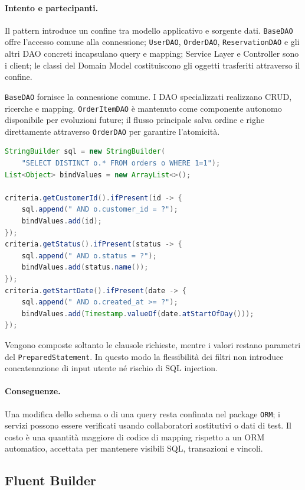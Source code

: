 \documentclass[12pt,a4paper]{article}
\newcommand{\code}[1]{\nolinkurl{#1}}
\begin{document}
\paragraph{Intento e partecipanti.}
Il pattern introduce un confine tra modello applicativo e sorgente dati.
\code{BaseDAO} offre l'accesso comune alla connessione; \code{UserDAO},
\code{OrderDAO}, \code{ReservationDAO} e gli altri DAO concreti incapsulano
query e mapping; Service Layer e Controller sono i client; le classi del Domain
Model costituiscono gli oggetti trasferiti attraverso il confine.

\code{BaseDAO} fornisce la connessione comune. I DAO specializzati realizzano
CRUD, ricerche e mapping. \code{OrderItemDAO} è mantenuto come componente
autonomo disponibile per evoluzioni future; il flusso principale salva ordine e
righe direttamente attraverso \code{OrderDAO} per garantire l'atomicità.

\begin{lstlisting}[style=codeStyle,language=Java,
caption={Costruzione sicura di una ricerca SQL dinamica.}]
StringBuilder sql = new StringBuilder(
    "SELECT DISTINCT o.* FROM orders o WHERE 1=1");
List<Object> bindValues = new ArrayList<>();

criteria.getCustomerId().ifPresent(id -> {
    sql.append(" AND o.customer_id = ?");
    bindValues.add(id);
});
criteria.getStatus().ifPresent(status -> {
    sql.append(" AND o.status = ?");
    bindValues.add(status.name());
});
criteria.getStartDate().ifPresent(date -> {
    sql.append(" AND o.created_at >= ?");
    bindValues.add(Timestamp.valueOf(date.atStartOfDay()));
});
\end{lstlisting}

Vengono composte soltanto le clausole richieste, mentre i valori restano
parametri del \code{PreparedStatement}. In questo modo la flessibilità dei filtri
non introduce concatenazione di input utente né rischio di SQL injection.

\paragraph{Conseguenze.}
Una modifica dello schema o di una query resta confinata nel package
\code{ORM}; i servizi possono essere verificati usando collaboratori
sostitutivi o dati di test. Il costo è una quantità maggiore di codice di
mapping rispetto a un ORM automatico, accettata per mantenere visibili SQL,
transazioni e vincoli.

\subsection{Fluent Builder}
\end{document}
